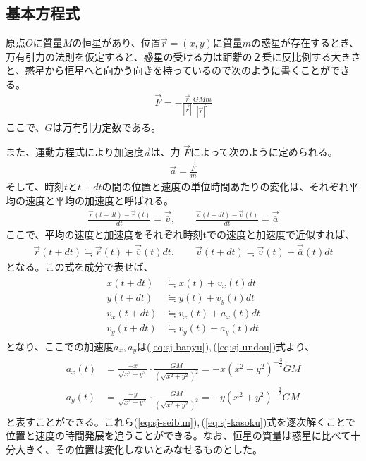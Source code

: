 \documentclass[11pt,b5paper,papersize,dvipdfmx]{jsbook}
\begin{document}
\subsection{基本方程式}
原点$O$に質量$M$の恒星があり、位置$\vec{r}=(x,y)$に質量$m$の惑星が存在するとき、万有引力の法則を仮定すると、惑星の受ける力は距離の２乗に反比例する大きさと、惑星から恒星へと向かう向きを持っているので次のように書くことができる。
\begin{align}
    \vec{F} = -\frac{\vec r}{|\vec{r}|}\frac{GMm}{|\vec{r}|^2}
    \label{eq:sj-banyu}
\end{align}
ここで、$G$は万有引力定数である。\par
また、運動方程式により加速度$\vec{a}$は、力 $\vec{F}$によって次のように定められる。
\begin{align}
    \vec{a} = \frac{\vec{F}}{m}
    \label{eq:sj-undou}
\end{align}
そして、時刻$t$と$t+dt$の間の位置と速度の単位時間あたりの変化は、それぞれ平均の速度と平均の加速度と呼ばれる。
\begin{align}
    \frac{\vec{r}(t+dt) - \vec{r}(t)}{dt} = \vec{\overline{v}},
    \qquad
    \frac{\vec{v}(t+dt) - \vec{v}(t)}{dt} = \vec{\overline{a}}
\end{align}
ここで、平均の速度と加速度をそれぞれ時刻tでの速度と加速度で近似すれば、
\begin{align}
    \vec{r}(t+dt) \fallingdotseq \vec{r}(t) + \vec{\overline{v}}(t)dt,
    \qquad
    \vec{v}(t+dt) \fallingdotseq \vec{v}(t) + \vec{\overline{a}}(t)dt
\end{align}
となる。この式を成分で表せば、
\begin{align}
    \begin{split}
        x(t+dt) &\fallingdotseq x(t) + v_x(t)dt\\
        y(t+dt) &\fallingdotseq y(t) + v_y(t)dt\\
        v_x(t+dt) &\fallingdotseq v_x(t) + a_x(t)dt\\
        v_y(t+dt) &\fallingdotseq v_y(t) + a_y(t)dt
    \end{split}
    \label{eq:sj-seibun}
\end{align}
となり、ここでの加速度$a_x,a_y$は(\ref{eq:sj-banyu}),\,(\ref{eq:sj-undou})式より、
\begin{align}
\begin{split}
a_x(t) &= \frac{-x}{\sqrt{x^2+y^2}}\cdot \frac{GM}{(\sqrt{x^2+y^2})^2} = -x(x^2+y^2)^{-\frac{3}{2}}GM\\
a_y(t) &= \frac{-y}{\sqrt{x^2+y^2}}\cdot \frac{GM}{(\sqrt{x^2+y^2})^2} = -y(x^2+y^2)^{-\frac{3}{2}}GM
\end{split}
\label{eq:sj-kasoku}
\end{align}
と表すことができる。これら(\ref{eq:sj-seibun}),\,(\ref{eq:sj-kasoku})式を逐次解くことで位置と速度の時間発展を追うことができる。なお、恒星の質量は惑星に比べて十分大きく、その位置は変化しないとみなせるものとした。
\end{document}
